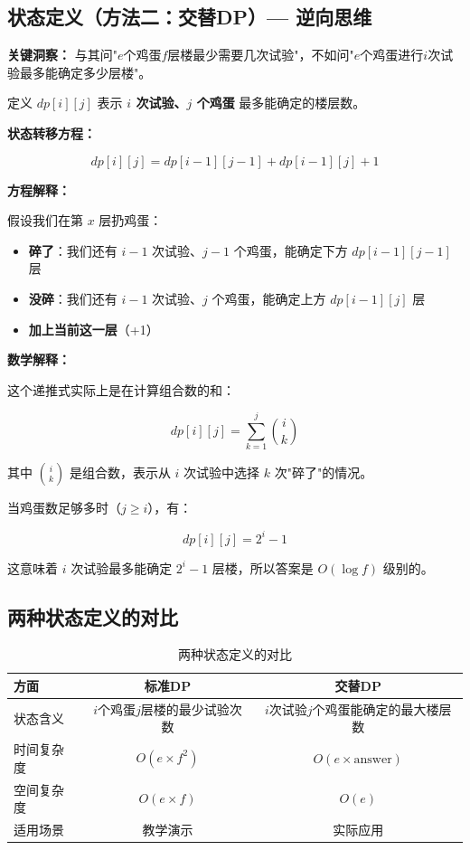 \documentclass[12pt,a4paper]{article}
\begin{document}
\subsection{状态定义（方法二：交替DP）--- 逆向思维}

\textbf{关键洞察：} 与其问"$e$个鸡蛋$f$层楼最少需要几次试验"，不如问"$e$个鸡蛋进行$i$次试验最多能确定多少层楼"。

定义 $dp[i][j]$ 表示 \textbf{$i$ 次试验、$j$ 个鸡蛋} 最多能确定的楼层数。

\textbf{状态转移方程：}

\begin{equation}
dp[i][j] = dp[i-1][j-1] + dp[i-1][j] + 1
\end{equation}

\textbf{方程解释：}

假设我们在第 $x$ 层扔鸡蛋：
\begin{itemize}
    \item \textbf{碎了}：我们还有 $i-1$ 次试验、$j-1$ 个鸡蛋，能确定下方 $dp[i-1][j-1]$ 层
    \item \textbf{没碎}：我们还有 $i-1$ 次试验、$j$ 个鸡蛋，能确定上方 $dp[i-1][j]$ 层
    \item \textbf{加上当前这一层}（+1）
\end{itemize}

\textbf{数学解释：}

这个递推式实际上是在计算组合数的和：

\begin{equation}
dp[i][j] = \sum_{k=1}^{j} \binom{i}{k}
\end{equation}

其中 $\binom{i}{k}$ 是组合数，表示从 $i$ 次试验中选择 $k$ 次"碎了"的情况。

当鸡蛋数足够多时（$j \geq i$），有：

\begin{equation}
dp[i][j] = 2^i - 1
\end{equation}

这意味着 $i$ 次试验最多能确定 $2^i - 1$ 层楼，所以答案是 $O(\log f)$ 级别的。

\subsection{两种状态定义的对比}

\begin{table}[H]
\centering
\caption{两种状态定义的对比}
\begin{tabular}{@{}lcc@{}}
\toprule
\textbf{方面} & \textbf{标准DP} & \textbf{交替DP} \\
\midrule
状态含义 & $i$个鸡蛋$j$层楼的最少试验次数 & $i$次试验$j$个鸡蛋能确定的最大楼层数 \\
时间复杂度 & $O(e \times f^2)$ & $O(e \times \text{answer})$ \\
空间复杂度 & $O(e \times f)$ & $O(e)$ \\
适用场景 & 教学演示 & 实际应用 \\
\bottomrule
\end{tabular}
\end{table}
\end{document}
